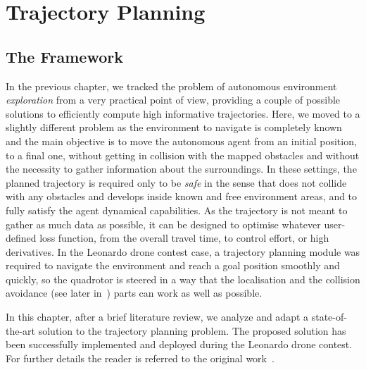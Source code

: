 \chapter{Trajectory Planning}%
\label{CH:PLANNING}

\section{The Framework}
In the previous chapter, we tracked the problem of autonomous environment \emph{exploration} from a very practical point of view,
providing a couple of possible solutions to efficiently compute high informative trajectories. Here, we moved to a slightly different
problem as the environment to navigate is completely known and the main objective is to move the autonomous agent from an initial
position, to a final one, without getting in collision with the mapped obstacles and without the necessity to gather information about
the surroundings. In these settings, the planned trajectory is required only to be \emph{safe} in the sense that does not collide with
any obstacles and develops inside known and free environment areas, and to fully satisfy the agent dynamical capabilities.
As the trajectory is not meant to gather as much data as possible, it can be designed to optimise whatever user-defined loss function,
from the overall travel time, to control effort, or high derivatives. In the Leonardo drone contest case, a trajectory planning module
was required to navigate the environment and reach a goal position smoothly and quickly, so the quadrotor is steered in a way that
the localisation and the collision avoidance (see later in~) parts can work as well as possible.

In this chapter, after a brief literature review, we analyze and adapt a state-of-the-art solution to the trajectory planning problem.
The proposed solution has been successfully implemented and deployed during the Leonardo drone contest.
For further details the reader is referred to the original work~\cite{zhou2019robust}.


